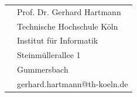 \begin{titlepage}
\begin{center}
\begin{tabular}{rl}
							&  	\quad Prof. Dr. Gerhard Hartmann\\
							&  	\quad Technische Hochschule Köln\\
							&  	\quad Institut für Informatik\\
							&	\quad Steinmüllerallee 1\\
							&	\quad 51643 Gummersbach\\
							&  	\quad gerhard.hartmann@th-koeln.de\\[2.0em]
\end{tabular}
\end{center}

\end{titlepage}
